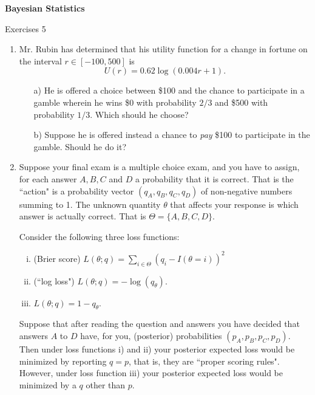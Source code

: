 \documentclass[12pt]{article}
\begin{document}
\begin{center}
{\bf
Bayesian Statistics

\smallskip

Exercises 5}

\smallskip


\end{center}


\bigskip

\begin{enumerate}


\item Mr. Rubin has determined that his utility function for a change in fortune on the interval $r \in [-100,500]$ is $$U(r) = 0.62 \log (0.004r + 1).$$
\begin{enumerate}
\item[a)] He is offered a choice between \$100 and the chance to participate in a gamble wherein he wins \$0 with probability $2/3$ and \$500 with probability $1/3$. Which should he choose?
\item[b)] Suppose he is offered instead a chance to {\it pay} \$100 to participate in the gamble. Should he do it?
\end{enumerate}


\item Suppose your final exam is a multiple choice exam, and you have to assign, for each
answer $A,B,C$ and $D$ a probability that it is correct. That is the ``action" is a probability vector
$(q_A,q_B,q_C,q_D)$ of non-negative numbers summing to 1. The unknown quantity $\theta$ that
affects your response is which answer is actually correct. That is $\Theta = \{A, B, C, D\}$. 

Consider the following three loss functions:
\begin{enumerate}[i)]
\item (Brier score) $L(\theta;q) = \sum_{i \in \Theta} (q_i - I(\theta=i))^2$
\item (``log loss")  $L(\theta;q) = -\log(q_\theta)$.
\item $L(\theta;q) = 1-q_\theta$.
\end{enumerate}

Suppose that after reading the question and answers you have decided that
answers $A$ to $D$ have, for you,  (posterior) probabilities $(p_A,p_B,p_C,p_D)$. 
Then under loss functions i) and ii) your posterior expected loss would be minimized by reporting $q=p$,
that is, they are ``proper scoring rules". 
However, under loss function iii) your posterior expected loss would be minimized by a $q$ other than $p$.


\end{enumerate}
\end{document}
